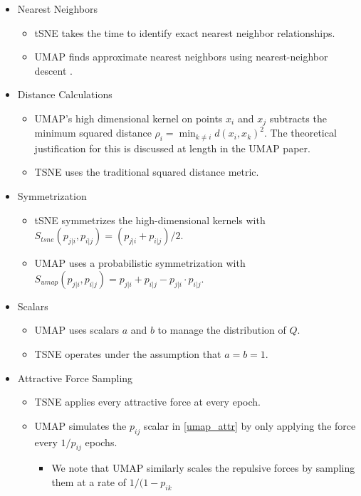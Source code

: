 \documentclass[sigconf, nonacm]{acmart}
\begin{document}
\begin{itemize}
    \item Nearest Neighbors
        \begin{itemize}
        \item tSNE takes the time to identify exact nearest neighbor relationships.
        \item UMAP finds approximate nearest neighbors using nearest-neighbor descent \cite{dong2011efficient}.
        \end{itemize}

    \item Distance Calculations
        \begin{itemize}
        \item UMAP's high dimensional kernel on points $x_i$ and $x_j$ subtracts the minimum squared distance $\rho_i = \min_{k \neq i} d(x_i, x_k)^2$.
            The theoretical justification for this is discussed at length in the UMAP paper. 
        \item TSNE uses the traditional squared distance metric.
        \end{itemize}

    \item Symmetrization
        \begin{itemize}
        \item tSNE symmetrizes the high-dimensional kernels with $S_{tsne}(p_{j|i}, p_{i|j}) = (p_{j|i} + p_{i|j}) / 2$.
        \item UMAP uses a probabilistic symmetrization with $S_{umap}(p_{j|i}, p_{i|j}) = p_{j|i} + p_{i|j} - p_{j|i} \cdot p_{i|j}$.
        \end{itemize}

    \item Scalars
        \begin{itemize}
        \item UMAP uses scalars $a$ and $b$ to manage the distribution of $Q$.
        \item TSNE operates under the assumption that $a = b = 1$.
        \end{itemize}

    \item Attractive Force Sampling
        \begin{itemize}
        \item TSNE applies every attractive force at every epoch.
        \item UMAP simulates the $p_{ij}$ scalar in \ref{umap_attr} by only applying the force every $1 / p_{ij}$ epochs.
            \begin{itemize}
                \item We note that UMAP similarly scales the repulsive forces by sampling them at a rate of $1 / (1 - p_{ik}$
            \end{itemize}
        \end{itemize}


\end{itemize}
\end{document}
